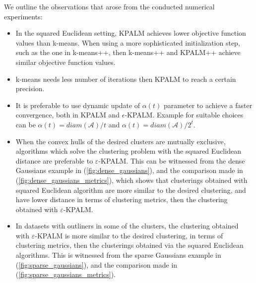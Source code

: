 We outline the observations that arose from the conducted numerical experiments:
\begin{itemize}
	\item In the squared Euclidean setting, KPALM achieves lower objective function values than k-means. When using a more sophisticated initialization step, such as the one in k-means++, then k-means++ and KPALM++ achieve similar objective function values.
	\item k-means needs less number of iterations then KPALM to reach a certain precision.
	\item It is preferable to use dynamic update of $\alpha(t)$ parameter to achieve a faster convergence, both in KPALM and $\epsilon$-KPALM. Example for suitable choices can be $\alpha(t)= diam(\mathcal{A})/t$ and $\alpha(t)= diam(\mathcal{A})/2^t$.
	\item When the convex hulls of the desired clusters are mutually exclusive, algorithms which solve the clustering problem with the squared Euclidean distance are preferable to $\varepsilon$-KPALM. 
	This can be witnessed from the dense Gaussians example in (\ref{fig:dense_gaussians}), and the comparison made in (\ref{fig:dense_gaussians_metrics}), which shows that clusterings obtained with squared Euclidean algorithm are more similar to the desired clustering, and have lower distance in terms of clustering metrics, then the clustering obtained with $\varepsilon$-KPALM.
	\item In datasets with outliners in some of the clusters, the clustering obtained with $\varepsilon$-KPALM is more similar to the desired clustering, in terms of clustering metrics, then the clusterings obtained via the squared Euclidean algorithms. This is witnessed from the sparse Gaussians example in (\ref{fig:sparse_gaussians}), and the comparison made in (\ref{fig:sparse_gaussians_metrics}).
\end{itemize}